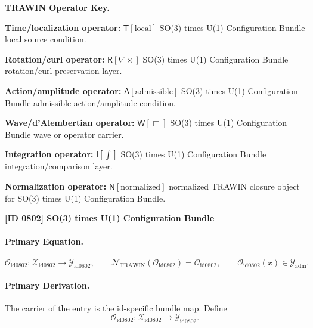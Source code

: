 \par\vspace{0.45\baselineskip}
\noindent\begin{minipage}[t]{\linewidth}
\begingroup
\small
\raggedright
\textbf{TRAWIN Operator Key.}\par
\noindent\textbf{Time/localization operator:} $\mathsf{T}\!\left[\mathrm{local}\right]$ SO(3) times U(1) Configuration Bundle local source condition.\par
\noindent\textbf{Rotation/curl operator:} $\mathsf{R}\!\left[\nabla\times\right]$ SO(3) times U(1) Configuration Bundle rotation/curl preservation layer.\par
\noindent\textbf{Action/amplitude operator:} $\mathsf{A}\!\left[\mathrm{admissible}\right]$ SO(3) times U(1) Configuration Bundle admissible action/amplitude condition.\par
\noindent\textbf{Wave/d'Alembertian operator:} $\mathsf{W}\!\left[\Box\right]$ SO(3) times U(1) Configuration Bundle wave or operator carrier.\par
\noindent\textbf{Integration operator:} $\mathsf{I}\!\left[\int\right]$ SO(3) times U(1) Configuration Bundle integration/comparison layer.\par
\noindent\textbf{Normalization operator:} $\mathsf{N}\!\left[\mathrm{normalized}\right]$ normalized TRAWIN closure object for SO(3) times U(1) Configuration Bundle.\par
\endgroup
\end{minipage}

\clearpage
\noindent\textbf{[ID 0802] SO(3) times U(1) Configuration Bundle}\par
\vspace{0.35em}
\paragraph{Primary Equation.}
\[
\mathcal{O}_{\mathrm{id0802}}:\mathcal{X}_{\mathrm{id0802}}\longrightarrow \mathcal{Y}_{\mathrm{id0802}},\qquad
\mathcal{N}_{\mathrm{TRAWIN}}(\mathcal{O}_{\mathrm{id0802}})=\mathcal{O}_{\mathrm{id0802}},\qquad
\mathcal{O}_{\mathrm{id0802}}(x)\in\mathcal{Y}_{\mathrm{adm}}.
\]

\paragraph{Primary Derivation.} The carrier of the entry is the id-specific bundle map.  Define\[
\mathcal{O}_{\mathrm{id0802}}:\mathcal{X}_{\mathrm{id0802}}\longrightarrow \mathcal{Y}_{\mathrm{id0802}}.
\]

